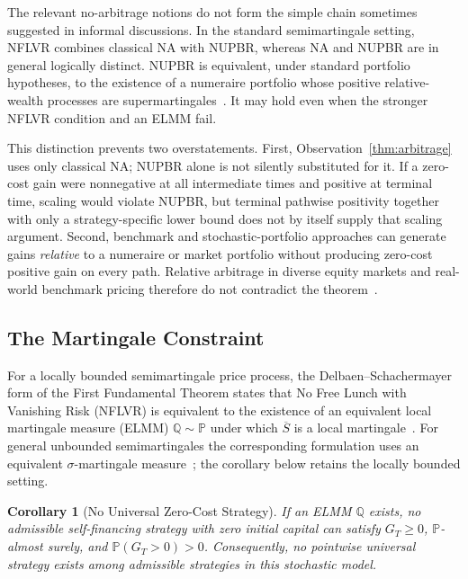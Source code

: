 \documentclass[aps,pra,reprint,superscriptaddress,amsmath,amssymb,floatfix]{revtex4-2}
\theoremstyle{plain}
\newtheorem{corollary}[theorem]{Corollary}
\theoremstyle{definition}
\theoremstyle{remark}
\begin{document}
The relevant no-arbitrage notions do not form the simple chain sometimes
suggested in informal discussions. In the standard semimartingale setting,
NFLVR combines classical NA with NUPBR, whereas NA and NUPBR are in general
logically distinct. NUPBR is equivalent, under standard portfolio hypotheses,
to the existence of a numeraire portfolio whose positive relative-wealth
processes are supermartingales~\cite{KaratzasKardaras2007,Kardaras2012}.
It may hold even when the stronger NFLVR condition and an ELMM fail.

This distinction prevents two overstatements. First, Observation~\ref{thm:arbitrage}
uses only classical NA; NUPBR alone is not silently substituted for it. If a
zero-cost gain were nonnegative at all intermediate times and positive at
terminal time, scaling would violate NUPBR, but terminal pathwise positivity
together with only a strategy-specific lower bound does not by itself supply
that scaling argument. Second, benchmark and stochastic-portfolio approaches
can generate gains \emph{relative} to a numeraire or market portfolio without
producing zero-cost positive gain on every path. Relative arbitrage in diverse
equity markets and real-world benchmark pricing therefore do not contradict
the theorem~\cite{FernholzKaratzasKardaras2005,PlatenHeath2010}.

\subsection{The Martingale Constraint}

For a locally bounded semimartingale price process, the
Delbaen--Schachermayer form of the First Fundamental Theorem states that No
Free Lunch with Vanishing Risk (NFLVR) is equivalent to the existence of an
equivalent local martingale measure (ELMM)
\(\mathbb{Q}\sim\mathbb{P}\) under which \(\overline S\) is a local
martingale~\cite{Harrison1981,Delbaen1994}. For general unbounded
semimartingales the corresponding formulation uses an equivalent
\(\sigma\)-martingale measure~\cite{DelbaenSchachermayer1998}; the corollary below
retains the locally bounded setting.

\begin{corollary}[No Universal Zero-Cost Strategy]
  \label{cor:noarb}
  If an ELMM \(\mathbb{Q}\) exists, no admissible self-financing strategy with
  zero initial capital can satisfy
  \(G_T\geq0\), \(\mathbb{P}\)-almost surely, and
  \(\mathbb{P}(G_T>0)>0\). Consequently, no pointwise universal strategy
  exists among admissible strategies in this stochastic model.
\end{corollary}
\end{document}
